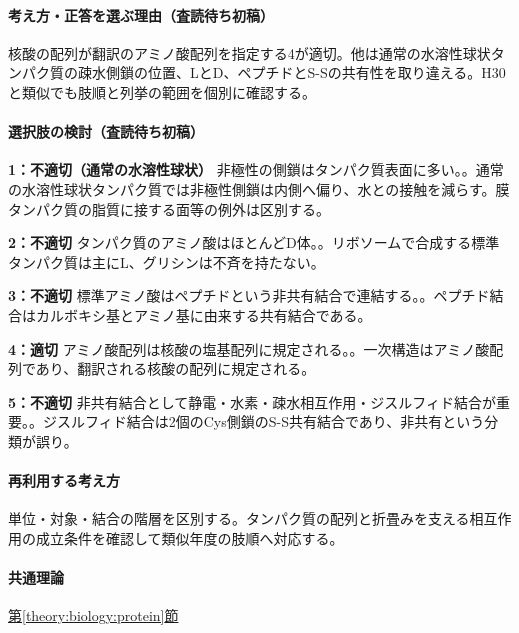 \paragraph{考え方・正答を選ぶ理由（査読待ち初稿）} 核酸の配列が翻訳のアミノ酸配列を指定する4が適切。他は通常の水溶性球状タンパク質の疎水側鎖の位置、LとD、ペプチドとS-Sの共有性を取り違える。H30と類似でも肢順と列挙の範囲を個別に確認する。

\paragraph{選択肢の検討（査読待ち初稿）}\mbox{}\par

\noindent\textbf{1：不適切（通常の水溶性球状）} 非極性の側鎖はタンパク質表面に多い。。通常の水溶性球状タンパク質では非極性側鎖は内側へ偏り、水との接触を減らす。膜タンパク質の脂質に接する面等の例外は区別する。\par

\noindent\textbf{2：不適切} タンパク質のアミノ酸はほとんどD体。。リボソームで合成する標準タンパク質は主にL、グリシンは不斉を持たない。\par

\noindent\textbf{3：不適切} 標準アミノ酸はペプチドという非共有結合で連結する。。ペプチド結合はカルボキシ基とアミノ基に由来する共有結合である。\par

\noindent\textbf{4：適切} アミノ酸配列は核酸の塩基配列に規定される。。一次構造はアミノ酸配列であり、翻訳される核酸の配列に規定される。\par

\noindent\textbf{5：不適切} 非共有結合として静電・水素・疎水相互作用・ジスルフィド結合が重要。。ジスルフィド結合は2個のCys側鎖のS-S共有結合であり、非共有という分類が誤り。\par

\paragraph{再利用する考え方} 単位・対象・結合の階層を区別する。タンパク質の配列と折畳みを支える相互作用の成立条件を確認して類似年度の肢順へ対応する。

\paragraph{共通理論} \hyperref[theory:biology:protein]{第\ref*{theory:biology:protein}節}

